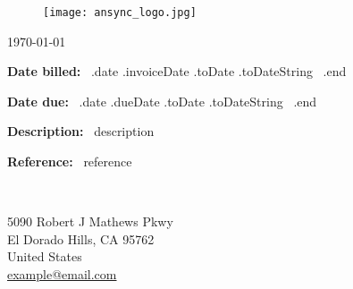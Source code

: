 
\pagestyle{plain} %




\begin{figure} %
	\hspace{15.35cm}
	\texttt{[image: ansync\_logo.jpg]} %
	\vspace{-20mm}
\end{figure}
 {\today} %


\outputinvoicenum %

\begin{minipage}[t]{0.5\textwidth}
	\textbf{Date billed:} ~.date .invoiceDate .toDate .toDateString ~.end
	
	\textbf{Date due:} ~.date .dueDate .toDate .toDateString ~.end
	
	\textbf{Description:} ~description
	
	\textbf{Reference:} ~reference
\end{minipage}
\begin{minipage}[t]{0.15\textwidth}
	~ %
\end{minipage}
\begin{minipage}[t]{0.35\textwidth}
	
	5090 Robert J Mathews Pkwy\\ %
	El Dorado Hills, CA 95762 \\
	United States \\
	\href{mailto:example@email.com}{example@email.com} %
\end{minipage}

